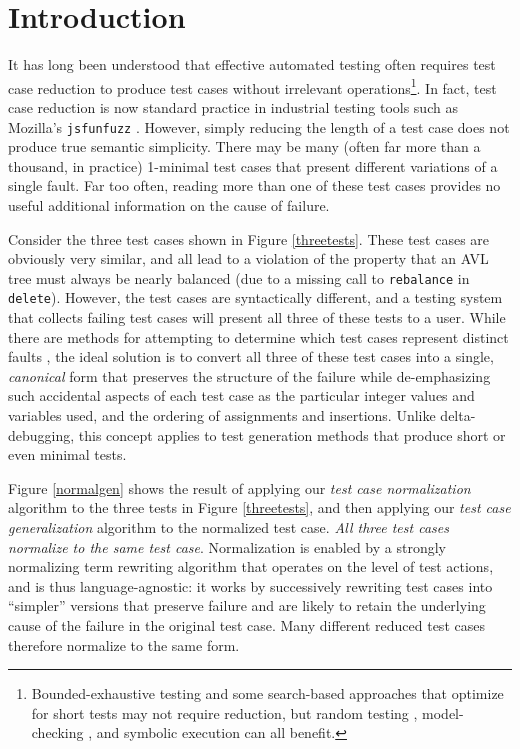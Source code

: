 \section{Introduction}

It has long been understood that effective automated testing often requires
test case reduction \cite{DD,MinUnit,TCminim,ICSEDiff} to produce test cases
without irrelevant operations\footnote{Bounded-exhaustive testing
  \cite{SoftBET} and some search-based approaches that
  optimize for short tests \cite{FA11} may not require reduction, but random
  testing \cite{RandFormal,HamletOnly}, model-checking
  \cite{Gastin04minimizationof}, and symbolic execution \cite{issta14}
  can all benefit.}.  In fact, test case reduction is
now standard practice in industrial testing tools such as Mozilla's
{\tt jsfunfuzz} \cite{jsfunfuzz,jsfunfuzz2,lithium}.  However, simply reducing the length of a test case
does not produce true semantic simplicity.  There may be many
(often far more than a thousand, in practice) 1-minimal test cases
that present different variations of a single fault.  Far too often,
reading more than one of these test cases provides no useful
additional information on the cause of failure. 

Consider the three test cases shown in Figure \ref{threetests}.  These
test cases are obviously very similar, and all lead to a
violation of the property that an AVL tree must always be nearly
balanced (due to a missing call to {\tt rebalance} in {\tt delete}).  However, the test cases are
syntactically different, and a testing system that collects
failing test cases will present all three of these tests to a user.
While there are methods for attempting to determine which test cases
represent distinct faults \cite{PLDI13}, the ideal solution is
to convert all three of these test cases into a single,
\emph{canonical} form that preserves the structure of the failure while de-emphasizing
such accidental aspects of each test case as the particular integer
values and variables used, and the ordering of assignments and
insertions.  Unlike delta-debugging, this concept applies to 
test generation methods that produce short or even minimal tests.

Figure \ref{normalgen} shows the result of applying our \emph{test
  case normalization} algorithm to the three tests in Figure
\ref{threetests}, and then applying our \emph{test case
  generalization} algorithm to the normalized test case.  \emph{All
  three test cases normalize to the same test case}.  Normalization is
enabled by a strongly normalizing term rewriting algorithm \cite{term2,term1} that operates
on the level of test actions, and is thus language-agnostic:
it works by successively rewriting test cases into ``simpler''
versions that preserve failure and are likely to retain the
underlying cause of the failure in the original test case. Many
different reduced test cases therefore normalize to the same form.

